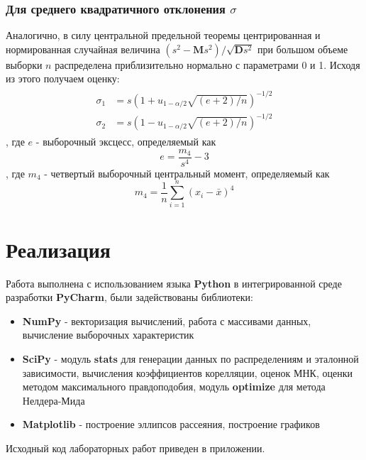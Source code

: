 \documentclass[12pt,a4paper]{article}
\begin{document}
\subsubsection{Для среднего квадратичного отклонения $\sigma$}
Аналогично, в силу центральной предельной теоремы центрированная и нормированная случайная величина $(s^2 - \mathbf{M}s^2) / \sqrt{\mathbf{D}s^2}$ при большом объеме выборки $n$ распределена приблизительно нормально с параметрами 0 и 1. Исходя из этого\cite[стр. 461]{verrazdely} получаем оценку:
\begin{align}\label{lab8:4}
\begin{split}
\sigma_1 &= s\left(1 + u_{1 - \alpha / 2} \sqrt{(e+2) / n}\right)^{-1 / 2} \\
\sigma_2 &= s\left(1 - u_{1 - \alpha / 2} \sqrt{(e+2) / n}\right)^{-1 / 2}
\end{split}
\end{align}
, где $e$ - выборочный эксцесс, определяемый как
\begin{equation}
e = \frac{m_4}{s^4} - 3
\end{equation}
, где $m_4$ - четвертый выборочный центральный момент, определяемый как
\begin{equation}
m_4 = \frac{1}{n} \sum_{i=1}^{n}\left(x_{i}-\bar{x}\right)^4
\end{equation}
\pagebreak

\section{Реализация}
\label{sec:impl}
Работа выполнена с использованием языка \textbf{Python} в интегрированной среде разработки \textbf{PyCharm}, были задействованы библиотеки:

\begin{itemize}
	\item \textbf{NumPy} - векторизация вычислений, работа с массивами данных, вычисление выборочных характеристик
	\item \textbf{SciPy} - модуль \textbf{stats} для генерации данных по распределениям и эталонной зависимости, вычисления коэффициентов корелляции, оценок МНК, оценки методом максимального правдоподобия, модуль \textbf{optimize} для метода Нелдера-Мида
	\item \textbf{Matplotlib} - построение эллипсов рассеяния, построение графиков
\end{itemize}

Исходный код лабораторных работ приведен в приложении. 
\pagebreak
\end{document}
